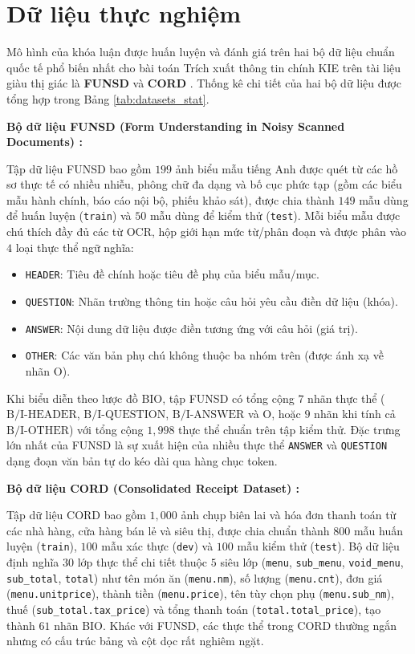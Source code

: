 \section{Dữ liệu thực nghiệm}
Mô hình của khóa luận được huấn luyện và đánh giá trên hai bộ dữ liệu chuẩn quốc tế phổ biến nhất cho bài toán Trích xuất thông tin chính KIE trên tài liệu giàu thị giác là \textbf{FUNSD} \cite{jaume2019funsd} và \textbf{CORD} \cite{park2019cord}. Thống kê chi tiết của hai bộ dữ liệu được tổng hợp trong Bảng \ref{tab:datasets_stat}.

\textbf{Bộ dữ liệu FUNSD (Form Understanding in Noisy Scanned Documents) \cite{jaume2019funsd}:}

Tập dữ liệu FUNSD bao gồm $199$ ảnh biểu mẫu tiếng Anh được quét từ các hồ sơ thực tế có nhiều nhiễu, phông chữ đa dạng và bố cục phức tạp (gồm các biểu mẫu hành chính, báo cáo nội bộ, phiếu khảo sát), được chia thành $149$ mẫu dùng để huấn luyện (\texttt{train}) và $50$ mẫu dùng để kiểm thử (\texttt{test}). Mỗi biểu mẫu được chú thích đầy đủ các từ OCR, hộp giới hạn mức từ/phân đoạn và được phân vào $4$ loại thực thể ngữ nghĩa:
\begin{itemize}
    \item \texttt{HEADER}: Tiêu đề chính hoặc tiêu đề phụ của biểu mẫu/mục.
    \item \texttt{QUESTION}: Nhãn trường thông tin hoặc câu hỏi yêu cầu điền dữ liệu (khóa).
    \item \texttt{ANSWER}: Nội dung dữ liệu được điền tương ứng với câu hỏi (giá trị).
    \item \texttt{OTHER}: Các văn bản phụ chú không thuộc ba nhóm trên (được ánh xạ về nhãn $\text{O}$).
\end{itemize}
Khi biểu diễn theo lược đồ BIO, tập FUNSD có tổng cộng $7$ nhãn thực thể ($\text{B/I-HEADER}$, $\text{B/I-QUESTION}$, $\text{B/I-ANSWER}$ và $\text{O}$, hoặc $9$ nhãn khi tính cả $\text{B/I-OTHER}$) với tổng cộng $1{,}998$ thực thể chuẩn trên tập kiểm thử. Đặc trưng lớn nhất của FUNSD là sự xuất hiện của nhiều thực thể \texttt{ANSWER} và \texttt{QUESTION} dạng đoạn văn bản tự do kéo dài qua hàng chục token.

\textbf{Bộ dữ liệu CORD (Consolidated Receipt Dataset) \cite{park2019cord}:}

Tập dữ liệu CORD bao gồm $1{,}000$ ảnh chụp biên lai và hóa đơn thanh toán từ các nhà hàng, cửa hàng bán lẻ và siêu thị, được chia chuẩn thành $800$ mẫu huấn luyện (\texttt{train}), $100$ mẫu xác thực (\texttt{dev}) và $100$ mẫu kiểm thử (\texttt{test}). Bộ dữ liệu định nghĩa $30$ lớp thực thể chi tiết thuộc $5$ siêu lớp (\texttt{menu}, \texttt{sub\_menu}, \texttt{void\_menu}, \texttt{sub\_total}, \texttt{total}) như tên món ăn (\texttt{menu.nm}), số lượng (\texttt{menu.cnt}), đơn giá (\texttt{menu.unitprice}), thành tiền (\texttt{menu.price}), tên tùy chọn phụ (\texttt{menu.sub\_nm}), thuế (\texttt{sub\_total.tax\_price}) và tổng thanh toán (\texttt{total.total\_price}), tạo thành $61$ nhãn BIO. Khác với FUNSD, các thực thể trong CORD thường ngắn nhưng có cấu trúc bảng và cột dọc rất nghiêm ngặt.

